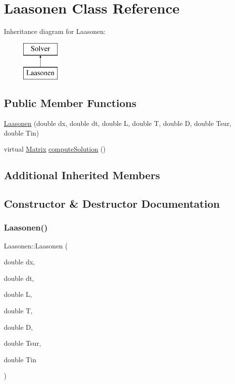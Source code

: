 \hypertarget{classLaasonen}{}\section{Laasonen Class Reference}
\label{classLaasonen}
Inheritance diagram for Laasonen\+:\begin{figure}[H]
\begin{center}
\leavevmode
\includegraphics[height=2.000000cm]{classLaasonen}
\end{center}
\end{figure}
\subsection*{Public Member Functions}
\begin{DoxyCompactItemize}
\item 
\mbox{\hyperlink{classLaasonen_a947e0e719ea5ffc3c327df1efb021c8c}{Laasonen}} (double dx, double dt, double L, double T, double D, double Tsur, double Tin)
\item 
virtual \mbox{\hyperlink{classMatrix}{Matrix}} \mbox{\hyperlink{classLaasonen_ae16757353c84d22b3a444116a64a6375}{compute\+Solution}} ()
\end{DoxyCompactItemize}
\subsection*{Additional Inherited Members}


\subsection{Constructor \& Destructor Documentation}
\mbox{\label{classLaasonen_a947e0e719ea5ffc3c327df1efb021c8c}} 
\subsubsection{\texorpdfstring{Laasonen()}{Laasonen()}}
{\footnotesize\ttfamily Laasonen\+::\+Laasonen (\begin{DoxyParamCaption}\item[{double}]{dx,  }\item[{double}]{dt,  }\item[{double}]{L,  }\item[{double}]{T,  }\item[{double}]{D,  }\item[{double}]{Tsur,  }\item[{double}]{Tin }\end{DoxyParamCaption})}

